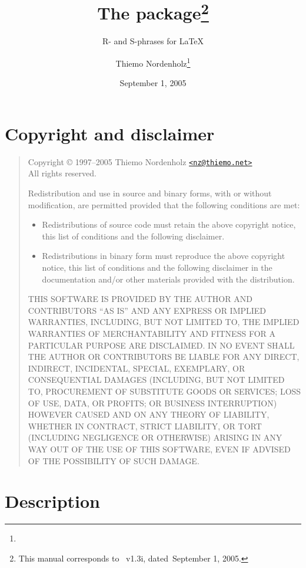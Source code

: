 \documentclass[pagesize=auto, fontsize=12pt, headings=normal]{scrartcl}
\title{The \pkg{r\_und\_s} package\thanks{This manual corresponds to \pkg{r\_und\_s.sty}~v1.3i, dated~September 1, 2005.}}
\subtitle{R- and S-phrases for \LaTeX}
\author{Thiemo Nordenholz\thanks{\mail{nz@thiemo.net}}}
\date{September 1, 2005}
\newcommand*{\bmail}[1]{\href{mailto:#1}{\texttt{<#1>}}}
\begin{document}
\maketitle
\tableofcontents


\section{Copyright and disclaimer}

\begin{quote}
  \footnotesize
  Copyright © 1997–2005 Thiemo Nordenholz \bmail{nz@thiemo.net} \\
  All rights reserved.

  Redistribution and use in source and binary forms, with or without
  modification, are permitted provided that the following conditions
  are met:
  \begin{itemize}
  \item Redistributions of source code must retain the above copyright
    notice, this list of conditions and the following disclaimer.
  \item Redistributions in binary form must reproduce the above copyright
    notice, this list of conditions and the following disclaimer in the
    documentation and/or other materials provided with the distribution.
  \end{itemize}

  \lsstyle
  THIS SOFTWARE IS PROVIDED BY THE AUTHOR AND CONTRIBUTORS ``AS IS'' AND
  ANY EXPRESS OR IMPLIED WARRANTIES, INCLUDING, BUT NOT LIMITED TO, THE
  IMPLIED WARRANTIES OF MERCHANTABILITY AND FITNESS FOR A PARTICULAR PURPOSE
  ARE DISCLAIMED.  IN NO EVENT SHALL THE AUTHOR OR CONTRIBUTORS BE LIABLE
  FOR ANY DIRECT, INDIRECT, INCIDENTAL, SPECIAL, EXEMPLARY, OR CONSEQUENTIAL
  DAMAGES (INCLUDING, BUT NOT LIMITED TO, PROCUREMENT OF SUBSTITUTE GOODS
  OR SERVICES; LOSS OF USE, DATA, OR PROFITS; OR BUSINESS INTERRUPTION)
  HOWEVER CAUSED AND ON ANY THEORY OF LIABILITY, WHETHER IN CONTRACT, STRICT
  LIABILITY, OR TORT (INCLUDING NEGLIGENCE OR OTHERWISE) ARISING IN ANY WAY
  OUT OF THE USE OF THIS SOFTWARE, EVEN IF ADVISED OF THE POSSIBILITY OF
  SUCH DAMAGE.
\end{quote}


\section{Description}
\end{document}
